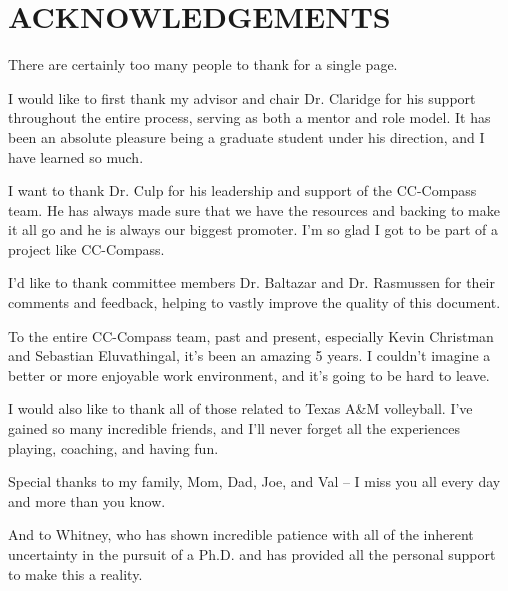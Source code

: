%
%
%


\chapter*{\texorpdfstring{\MakeUppercase{ACKNOWLEDGEMENTS}}{ACKNOWLEDGEMENTS}}


There are certainly too many people to thank for a single page.

I would like to first thank my advisor and chair Dr. Claridge for his
support throughout the entire process, serving as both a mentor and role
model. It has been an absolute pleasure being a graduate student under
his direction, and I have learned so much. 

I want to thank Dr. Culp for his leadership and support of the CC-Compass team.
He has always made sure that we have the resources and backing to make
it all go and he is always our biggest promoter. I'm so glad I got to be part
of a project like CC-Compass.

I'd like to thank committee members Dr. Baltazar and Dr. Rasmussen for
their comments and feedback, helping to vastly improve the quality of
this document.

To the entire CC-Compass team, past and present, especially Kevin
Christman and Sebastian Eluvathingal, it's been an amazing 5 years. I
couldn't imagine a better or more enjoyable work environment, and it's
going to be hard to leave. 

I would also like to thank all of those related to Texas A\&M
volleyball. I've gained so many incredible friends, and I'll never forget
all the experiences playing, coaching, and having fun. 

Special thanks to my family, Mom, Dad, Joe, and Val -- I miss you all
every day and more than you know.

And to Whitney, who has shown incredible patience with all of the
inherent uncertainty in the pursuit of a Ph.D. and has provided all the
personal support to make this a reality.

\pagebreak{}
